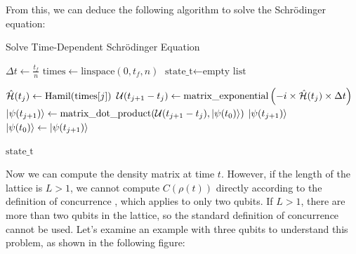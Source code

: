 From this, we can deduce the following algorithm to solve the Schrödinger equation:
\begin{algorithm}[H]
    \caption{Solve Time-Dependent Schrödinger Equation}
    \begin{algorithmic}[1]
    \State $\Delta t \gets \frac{t_f}{n}$
    \State $\text{times} \gets \text{linspace}(0, t_f, n)$
    \State $\text{state\_t} \gets \text{empty list}$
    
        \State $\hat{\mathcal{H}}(t_j) \gets \text{Hamil(times}[j])$
        \State $\mathcal{U}(t_{j+1}-t_j) \gets \text{matrix\_exponential}\left(-i \times \hat{\mathcal{H}}(t_j) \times \Delta t \right)$
        \State $\ket{\psi(t_{j+1})} \gets \text{matrix\_dot\_product}(\mathcal{U}(t_{j+1}-t_j), \ket{\psi(t_0)})$
        \State {} $\ket{\psi(t_{j+1})}$ 
        \State $\ket{\psi(t_0)} \gets \ket{\psi(t_{j+1})}$
    \EndFor
    
    \State \Return $\text{state\_t}$
    \EndProcedure
    \end{algorithmic}
\end{algorithm}

\newpage 


Now we can compute the density matrix at time \( t \). However, if the length of the lattice is \( L>1 \), we cannot 
compute \( C(\rho(t)) \) directly according to the definition of concurrence , which applies to only two qubits. If \( L>1 \), 
there are more than two qubits in the lattice, so the standard definition of concurrence cannot be used. 
Let's examine an example with three qubits to understand this problem, as shown in the following figure:



